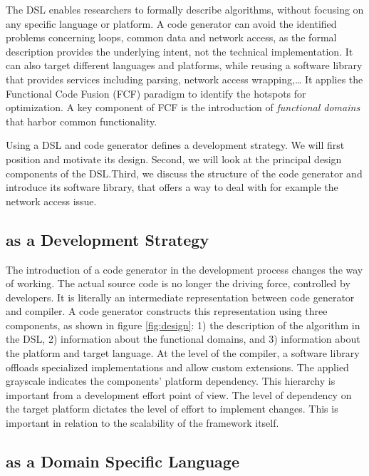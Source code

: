 \documentclass[3p,times,procedia]{elsarticle}
\begin{document}
The DSL enables researchers to formally describe algorithms, without focusing
on any specific language or platform. A code generator can avoid the identified
problems concerning loops, common data and network access, as the formal
description provides the underlying intent, not the technical implementation.
It can also target different languages and platforms, while reusing a software
library that provides services including parsing, network access wrapping,\dots
It applies the Functional Code Fusion (FCF) paradigm to identify the hotspots
for optimization. A key component of FCF is the introduction of
\emph{functional domains} that harbor common functionality.

Using a DSL and code generator defines a development strategy. We will first
position \FOO and motivate its design. Second, we will look at the principal
design components of the DSL.\@ Third, we discuss the structure of the code
generator and introduce its software library, that offers a way to deal with
for example the network access issue.

\vspace{-1mm}
\subsection{\FOO as a Development Strategy}
\label{positioning}

The introduction of a code generator in the development process changes the way
of working. The actual source code is no longer the driving force, controlled
by developers. It is literally an intermediate representation between code
generator and compiler. A code generator constructs this representation using
three components, as shown in figure \ref{fig:design}: 1) the description of
the algorithm in the DSL, 2) information about the functional domains, and 3)
information about the platform and target language. At the level of the
compiler, a software library offloads specialized implementations and allow
custom extensions. The applied grayscale indicates the components' platform
dependency. This hierarchy is important from a development effort point of
view. The level of dependency on the target platform dictates the level of
effort to implement changes. This is important in relation to the scalability
of the framework itself.

\vspace{-1mm}
\subsection{\FOO as a Domain Specific Language}
\label{dsl-design}
\end{document}
